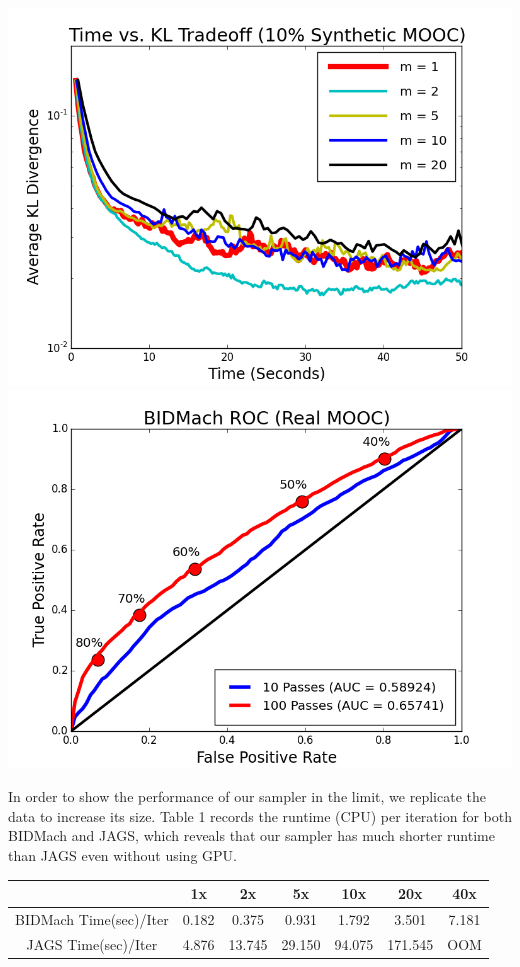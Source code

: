 \documentclass[a0paper,portrait]{baposter}
\begin{document}
\begin{poster}
{\begin{center}
\includegraphics[width=0.45\linewidth]{fig_kltime_tradeoff_mooc.png}
\includegraphics[width=0.45\linewidth]{fig_bidmach_real_mooc_roc_curve_v2.png}
\end{center}




In order to show the performance of our sampler in the limit, we replicate the data to increase its size. Table 1 records the runtime (CPU) per iteration for both BIDMach and JAGS, which reveals that our sampler has much shorter runtime than JAGS even without using GPU. 

\begin{center}
\begin{tabular}{ |c|c|c|c|c|c|c| } 
\hline
                  & 1x    & 2x    & 5x    & 10x   & 20x   & 40x   \\
\hline \hline
BIDMach Time(sec)/Iter & 0.182 & 0.375 & 0.931 & 1.792 & 3.501 & 7.181 \\ 
JAGS Time(sec)/Iter    & 4.876 & 13.745 & 29.150 & 94.075 & 171.545 & OOM \\
\hline
\end{tabular}
\end{center}

}
\end{poster}
\end{document}
